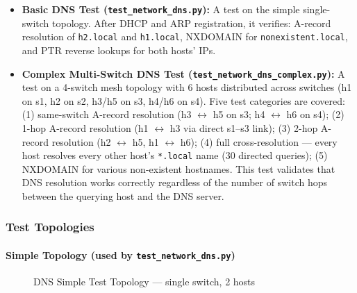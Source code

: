 \documentclass[12pt,a4paper]{article}
\begin{document}
\begin{itemize}[leftmargin=1.5cm]
    \item \textbf{Basic DNS Test (\texttt{test\_network\_dns.py}):} A test on the simple single-switch topology. After DHCP and ARP registration, it verifies: A-record resolution of \texttt{h2.local} and \texttt{h1.local}, NXDOMAIN for \texttt{nonexistent.local}, and PTR reverse lookups for both hosts' IPs.
    \item \textbf{Complex Multi-Switch DNS Test (\texttt{test\_network\_dns\_complex.py}):} A test on a 4-switch mesh topology with 6 hosts distributed across switches (h1 on s1, h2 on s2, h3/h5 on s3, h4/h6 on s4). Five test categories are covered: (1) same-switch A-record resolution (h3 $\leftrightarrow$ h5 on s3; h4 $\leftrightarrow$ h6 on s4); (2) 1-hop A-record resolution (h1 $\leftrightarrow$ h3 via direct s1--s3 link); (3) 2-hop A-record resolution (h2 $\leftrightarrow$ h5, h1 $\leftrightarrow$ h6); (4) full cross-resolution --- every host resolves every other host's \texttt{*.local} name (30 directed queries); (5) NXDOMAIN for various non-existent hostnames. This test validates that DNS resolution works correctly regardless of the number of switch hops between the querying host and the DNS server.
\end{itemize}

\subsubsection{Test Topologies}

\paragraph{Simple Topology (used by \texttt{test\_network\_dns.py})}

\begin{figure}[H]
\centering
{}
\caption{DNS Simple Test Topology --- single switch, 2 hosts}
\end{figure}
\end{document}
